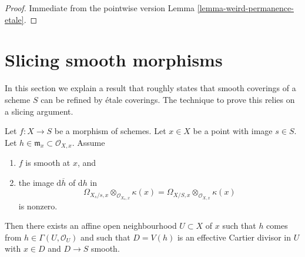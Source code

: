 \begin{proof}
Immediate from the pointwise version
Lemma \ref{lemma-weird-permanence-etale}.
\end{proof}










\section{Slicing smooth morphisms}
\label{section-etale-over-smooth}

\noindent
In this section we explain a result that roughly states that
smooth coverings of a scheme $S$ can be refined by \'etale coverings.
The technique to prove this relies on a slicing argument.

\begin{lemma}
\label{lemma-slice-smooth-given-element}
Let $f : X \to S$ be a morphism of schemes.
Let $x \in X$ be a point with image $s \in S$.
Let $h \in \mathfrak m_x \subset \mathcal{O}_{X, x}$.
Assume
\begin{enumerate}
\item $f$ is smooth at $x$, and
\item the image $\text{d}\overline{h}$ of $\text{d}h$ in
$$
\Omega_{X_s/s, x} \otimes_{\mathcal{O}_{X_s, x}} \kappa(x) =
\Omega_{X/S, x} \otimes_{\mathcal{O}_{X, x}} \kappa(x)
$$
is nonzero.
\end{enumerate}
Then there exists an affine open neighbourhood $U \subset X$ of $x$
such that $h$ comes from $h \in \Gamma(U, \mathcal{O}_U)$ and such
that $D = V(h)$ is an effective Cartier divisor in $U$ with $x \in D$ and
$D \to S$ smooth.
\end{lemma}

